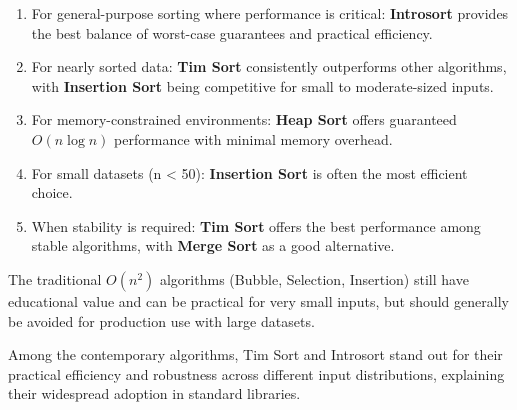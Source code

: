 \documentclass[sigconf]{acmart}
\begin{document}
\begin{enumerate}
    \item For general-purpose sorting where performance is critical: \textbf{Introsort} provides the best balance of worst-case guarantees and practical efficiency.
    
    \item For nearly sorted data: \textbf{Tim Sort} consistently outperforms other algorithms, with \textbf{Insertion Sort} being competitive for small to moderate-sized inputs.
    
    \item For memory-constrained environments: \textbf{Heap Sort} offers guaranteed $O(n \log n)$ performance with minimal memory overhead.
    
    \item For small datasets (n < 50): \textbf{Insertion Sort} is often the most efficient choice.
    
    \item When stability is required: \textbf{Tim Sort} offers the best performance among stable algorithms, with \textbf{Merge Sort} as a good alternative.
\end{enumerate}

The traditional $O(n^2)$ algorithms (Bubble, Selection, Insertion) still have educational value and can be practical for very small inputs, but should generally be avoided for production use with large datasets.

Among the contemporary algorithms, Tim Sort and Introsort stand out for their practical efficiency and robustness across different input distributions, explaining their widespread adoption in standard libraries.

\nocite{*}



\end{document}
